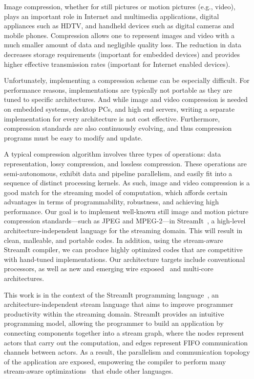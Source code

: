 
Image compression, whether for still pictures or motion pictures
(e.g., video), plays an important role in Internet and multimedia
applications, digital appliances such as HDTV, and handheld devices
such as digital cameras and mobile phones. Compression allows one to
represent images and video with a much smaller amount of data and
negligible quality loss. The reduction in data decreases storage
requirements (important for embedded devices) and provides higher
effective transmission rates (important for Internet enabled devices).

Unfortunately, implementing a compression scheme can be especially
difficult. For performance reasons, implementations are typically not
portable as they are tuned to specific architectures. And while image
and video compression is needed on embedded systems, desktop PCs, and
high end servers, writing a separate implementation for every
architecture is not cost effective. Furthermore, compression standards
are also continuously evolving, and thus compression programs must be
easy to modify and update.

A typical compression algorithm involves three types of operations:
data representation, lossy compression, and lossless
compression. These operations are semi-autonomous, exhibit data and
pipeline parallelism, and easily fit into a sequence of distinct
processing kernels. As such, image and video compression is a good
match for the streaming model of computation, which affords certain
advantages in terms of programmability, robustness, and achieving high
performance. Our goal is to implement well-known still image and
motion picture compression standards---such as JPEG and MPEG-2---in
StreamIt~\cite{streamitcc}, a high-level architecture-independent
language for the streaming domain. This will result in clean,
malleable, and portable codes.
In addition, using the stream-aware StreamIt compiler, we can produce
highly optimized codes that are competitive with hand-tuned
implementations. Our architecture targets include conventional
processors, as well as new and emerging wire
exposed~\cite{raw02ieee,raw04isca} and multi-core architectures.

This work is in the context of the StreamIt programming
language~\cite{streamit-cc}, an architecture-independent stream
language that aims to improve programmer productivity within the
streaming domain. StreamIt provides an intuitive programming model,
allowing the programmer to build an application by connecting
components together into a stream graph, where the nodes represent
actors that carry out the computation, and edges represent FIFO
communication channels between actors. As a result, the parallelism
and communication topology of the application are exposed, empowering
the compiler to perform many stream-aware
optimizations~\cite{lamb03pldi,agrawal05cases,sermulins05lctes,gordon02asplos}
that elude other languages.

